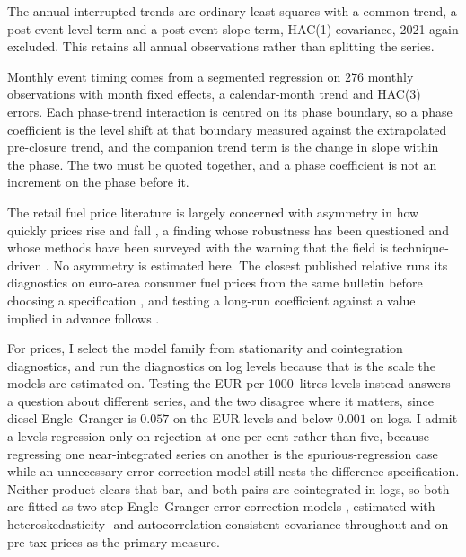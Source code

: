 \documentclass[11pt,a4paper]{article}
\begin{document}
The annual interrupted trends are ordinary least squares with a common trend, a post-event
level term and a post-event slope term, HAC(1) covariance, 2021 again excluded. This retains all
annual observations rather than splitting the series.

Monthly event timing comes from a segmented regression \citep{wagner2002segmented,
bernal2017interrupted} on $276$ monthly observations with month
fixed effects, a calendar-month trend and HAC(3) errors. Each phase-trend interaction is centred
on its phase boundary, so a phase coefficient is the level shift at that boundary measured
against the extrapolated pre-closure trend, and the companion trend term is the change in slope
within the phase. The two must be quoted together, and a phase coefficient is not an increment on
the phase before it.

The retail fuel price literature is largely concerned with asymmetry in how quickly prices
rise and fall \citep{bacon1991rockets, borenstein1997gasoline, peltzman2000prices}, a finding
whose robustness has been questioned \citep{bachmeier2003new} and whose methods have been
surveyed with the warning that the field is technique-driven \citep{meyer2004asymmetric}. No
asymmetry is estimated here. The closest published relative runs its diagnostics on euro-area
consumer fuel prices from the same bulletin before choosing a specification
\citep{meyler2009passthrough}, and testing a long-run coefficient against a value implied in
advance follows \citet{bachmeier2006testing}.

For prices, I select the model family from stationarity and cointegration diagnostics, and run
the diagnostics on log levels because that is the scale the models are estimated on. Testing the
EUR per 1000~litres levels instead answers a question about different series, and the two
disagree where it matters, since diesel Engle--Granger is $0.057$ on the EUR levels and below
$0.001$ on logs. I admit a levels regression only on rejection at one per cent rather than five,
because regressing one near-integrated series on another is the spurious-regression case while
an unnecessary error-correction model still nests the difference specification. Neither product
clears that bar, and both pairs are cointegrated in logs, so both are fitted as two-step Engle--Granger
error-correction models \citep{engle1987cointegration}, estimated with
heteroskedasticity- and autocorrelation-consistent covariance throughout \citep{newey1987simple,
andrews1991heteroskedasticity} and on pre-tax prices as the primary measure.
\end{document}
